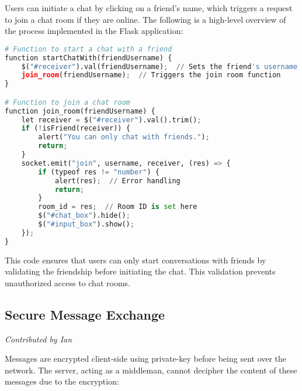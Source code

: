 \documentclass{article}
\begin{document}
Users can initiate a chat by clicking on a friend's name, which triggers a request to join a chat room if they are online. The following is a high-level overview of the process implemented in the Flask application:

\begin{lstlisting}[language=Python, caption={Joining a Chat Room}]
# Function to start a chat with a friend
function startChatWith(friendUsername) {
    $("#receiver").val(friendUsername);  // Sets the friend's username in the receiver input
    join_room(friendUsername);  // Triggers the join room function
}

# Function to join a chat room
function join_room(friendUsername) {
    let receiver = $("#receiver").val().trim();
    if (!isFriend(receiver)) {
        alert("You can only chat with friends.");
        return;
    }
    socket.emit("join", username, receiver, (res) => {
        if (typeof res != "number") {
            alert(res);  // Error handling
            return;
        }
        room_id = res;  // Room ID is set here
        $("#chat_box").hide();
        $("#input_box").show();
    });
}
\end{lstlisting}

This code ensures that users can only start conversations with friends by validating the friendship before initiating the chat. This validation prevents unauthorized access to chat rooms.

\subsection*{Secure Message Exchange}
\textit{Contributed by Ian}

Messages are encrypted client-side using private-key before being sent over the network. The server, acting as a middleman, cannot decipher the content of these messages due to the encryption:
\end{document}
